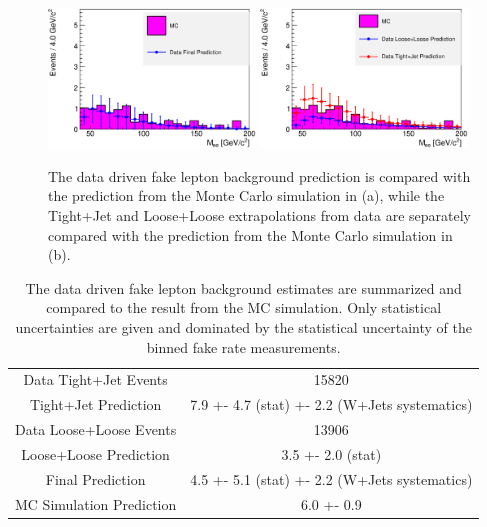 \documentclass{cmspaper}
\begin{document}
\begin{figure}[htb]
\begin{center}
\includegraphics[width=0.49\textwidth]{FakeRatePrediction_FinalVsMC.eps}
\includegraphics[width=0.49\textwidth]{FakeRatePrediction_LooseLooseTightJetVsMC.eps}
   \caption{The data driven fake lepton background prediction is compared with the prediction from the Monte Carlo simulation in (a), while the Tight+Jet and Loose+Loose extrapolations from data are separately compared with the prediction from the Monte Carlo simulation in (b). }
   \label{fig:ZeeTotalFakeBkgPrediction_Data}
\end{center}
\end{figure}


\begin{table}[!ht]
\begin{center}
\begin{tabular}{|c|c|}
\hline
 Data Tight+Jet Events               & 15820 \\
 Tight+Jet Prediction                & 7.9 +- 4.7 (stat) +- 2.2 (W+Jets systematics) \\
\hline
 Data Loose+Loose Events             & 13906 \\
 Loose+Loose Prediction              & 3.5 +- 2.0 (stat) \\
\hline
 Final Prediction                    & 4.5 +- 5.1 (stat) +- 2.2 (W+Jets systematics) \\
\hline
 MC Simulation Prediction            & 6.0 +- 0.9 \\
\hline
\end{tabular}
\caption{The data driven fake lepton background estimates are summarized and compared to the result from the MC simulation. Only statistical uncertainties are given and dominated by the statistical uncertainty of the binned fake rate measurements. \label{tab:dataPrediction}}
\end{center}
\end{table}
\end{document}
